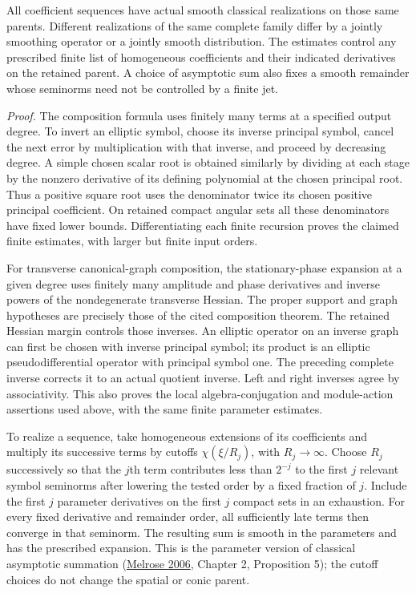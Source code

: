 \documentclass[
  english,
  11pt,
  reqno]{amsart}
\begin{document}
All coefficient sequences have actual smooth classical realizations on
those same parents. Different realizations of the same complete family
differ by a jointly smoothing operator or a jointly smooth distribution.
The estimates control any prescribed finite list of homogeneous
coefficients and their indicated derivatives on the retained parent. A
choice of asymptotic sum also fixes a smooth remainder whose seminorms
need not be controlled by a finite jet.

\emph{Proof.} The composition formula uses finitely many terms at a
specified output degree. To invert an elliptic symbol, choose its
inverse principal symbol, cancel the next error by multiplication with
that inverse, and proceed by decreasing degree. A simple chosen scalar
root is obtained similarly by dividing at each stage by the nonzero
derivative of its defining polynomial at the chosen principal root. Thus
a positive square root uses the denominator twice its chosen positive
principal coefficient. On retained compact angular sets all these
denominators have fixed lower bounds. Differentiating each finite
recursion proves the claimed finite estimates, with larger but finite
input orders.

For transverse canonical-graph composition, the stationary-phase
expansion at a given degree uses finitely many amplitude and phase
derivatives and inverse powers of the nondegenerate transverse Hessian.
The proper support and graph hypotheses are precisely those of the cited
composition theorem. The retained Hessian margin controls those
inverses. An elliptic operator on an inverse graph can first be chosen
with inverse principal symbol; its product is an elliptic
pseudodifferential operator with principal symbol one. The preceding
complete inverse corrects it to an actual quotient inverse. Left and
right inverses agree by associativity. This also proves the local
algebra-conjugation and module-action assertions used above, with the
same finite parameter estimates.

To realize a sequence, take homogeneous extensions of its coefficients
and multiply its successive terms by cutoffs \(\chi(\xi/R_j)\), with
\(R_j\to\infty\). Choose \(R_j\) successively so that the \(j\)th term
contributes less than \(2^{-j}\) to the first \(j\) relevant symbol
seminorms after lowering the tested order by a fixed fraction of \(j\).
Include the first \(j\) parameter derivatives on the first \(j\) compact
sets in an exhaustion. For every fixed derivative and remainder order,
all sufficiently late terms then converge in that seminorm. The
resulting sum is smooth in the parameters and has the prescribed
expansion. This is the parameter version of classical asymptotic
summation (\hyperref[ref-Melrose2006]{Melrose 2006}, Chapter 2,
Proposition 5); the cutoff choices do not change the spatial or conic
parent.
\end{document}
